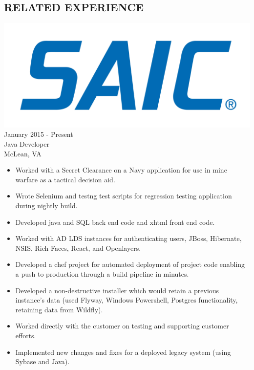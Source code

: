 \documentclass[12pt, line, margin]{res}
\begin{document}
\begin{resume}
\section{RELATED EXPERIENCE} {\sl  \includegraphics[scale=0.015, trim=110 200 110 120]{resume_images/SAIC_logo_RGB-lg.jpg}} \hfill January 2015 - Present \\
                Java Developer \\
                McLean, VA
                 \begin{itemize}  \itemsep -2pt %
                 \item   Worked with a Secret Clearance on a Navy application for use in 
			mine warfare as a tactical decision aid.
                 \item   Wrote Selenium and testng test scripts for regression testing \newline
			 application during nightly build.
	      \item   Developed java and SQL back end code and xhtml front end code.
	      \item   Worked with AD LDS instances for authenticating users, JBoss, \newline
			 Hibernate, NSIS, Rich Faces, React, and Openlayers.
	      \item   Developed a chef project for automated deployment of project \newline 
			code enabling a push to production through a build pipeline in  minutes.
	      \item   Developed a non-destructive installer which would retain a \newline
                                previous instance's data (used Flyway, Windows Powershell,\newline
                                Postgres functionality, retaining data from Wildfly). 
	      \item   Worked directly with the customer on testing and supporting \newline
			customer efforts.
	      \item   Implemented new changes and fixes for a deployed legacy system \newline
                                (using Sybase and Java).
                \end{itemize}
 

\end{resume}
\end{document}
